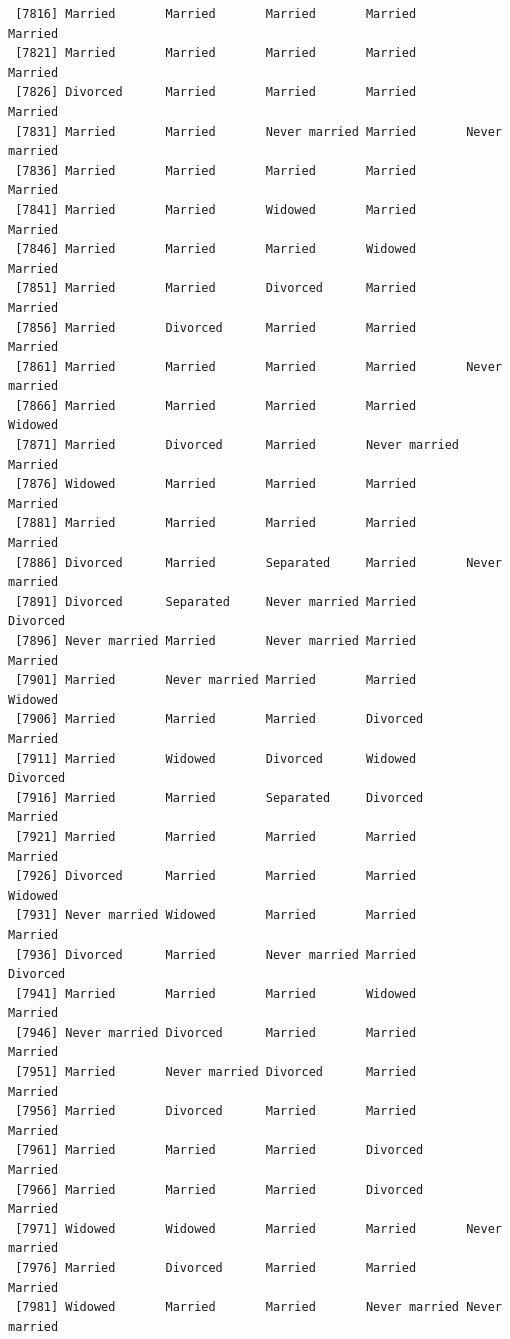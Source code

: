 \documentclass[
  letterpaper,
  DIV=11,
  numbers=noendperiod,
  oneside]{scrartcl}
\begin{document}
\begin{verbatim}
 [7816] Married       Married       Married       Married       Married      
 [7821] Married       Married       Married       Married       Married      
 [7826] Divorced      Married       Married       Married       Married      
 [7831] Married       Married       Never married Married       Never married
 [7836] Married       Married       Married       Married       Married      
 [7841] Married       Married       Widowed       Married       Married      
 [7846] Married       Married       Married       Widowed       Married      
 [7851] Married       Married       Divorced      Married       Married      
 [7856] Married       Divorced      Married       Married       Married      
 [7861] Married       Married       Married       Married       Never married
 [7866] Married       Married       Married       Married       Widowed      
 [7871] Married       Divorced      Married       Never married Married      
 [7876] Widowed       Married       Married       Married       Married      
 [7881] Married       Married       Married       Married       Married      
 [7886] Divorced      Married       Separated     Married       Never married
 [7891] Divorced      Separated     Never married Married       Divorced     
 [7896] Never married Married       Never married Married       Married      
 [7901] Married       Never married Married       Married       Widowed      
 [7906] Married       Married       Married       Divorced      Married      
 [7911] Married       Widowed       Divorced      Widowed       Divorced     
 [7916] Married       Married       Separated     Divorced      Married      
 [7921] Married       Married       Married       Married       Married      
 [7926] Divorced      Married       Married       Married       Widowed      
 [7931] Never married Widowed       Married       Married       Married      
 [7936] Divorced      Married       Never married Married       Divorced     
 [7941] Married       Married       Married       Widowed       Married      
 [7946] Never married Divorced      Married       Married       Married      
 [7951] Married       Never married Divorced      Married       Married      
 [7956] Married       Divorced      Married       Married       Married      
 [7961] Married       Married       Married       Divorced      Married      
 [7966] Married       Married       Married       Divorced      Married      
 [7971] Widowed       Widowed       Married       Married       Never married
 [7976] Married       Divorced      Married       Married       Married      
 [7981] Widowed       Married       Married       Never married Never married

\end{verbatim}
\end{document}

